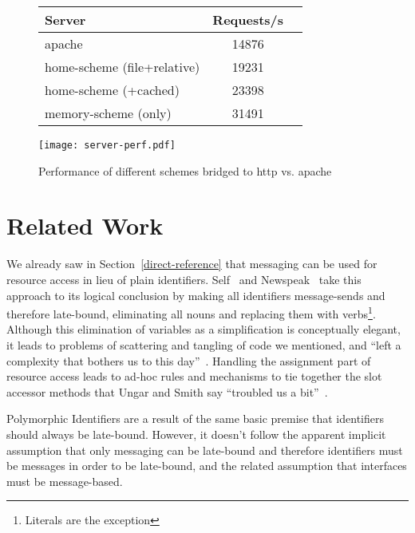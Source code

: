 \documentclass[preprint]{sigplanconf}
\begin{document}
\begin{figure}
\begin{minipage}[c]{0.58\textwidth}
\begin{tabular}{|l|c|c|} \hline
Server   &  Requests/s    \\ \hline
apache & 	14876	      \\ %
home-scheme (file+relative) &  19231   \\ %
home-scheme (+cached)  &  23398  \\ %
memory-scheme (only) &  31491  \\ \hline
\end{tabular}
\end{minipage}
\begin{minipage}[c]{0.58\textwidth}
\texttt{[image: server-perf.pdf]}
\end{minipage}
\vspace{-2.0em}
\caption{Performance of different schemes bridged to http vs. apache}
\label{http-server-speed}
\end{figure}





\section{Related Work}
\label{related-work}


We already saw in Section~\ref{direct-reference} that messaging can be used for resource
access in lieu of plain identifiers.  Self~\cite{UngarS87} and Newspeak~\cite{Bracha:2010:MON:1883978.1884007} take this
approach to its logical conclusion by making all identifiers message-sends and therefore late-bound, eliminating
all nouns and replacing them with verbs\footnote{Literals are the exception}.  Although
this elimination of variables as a simplification is conceptually elegant, it leads to problems of scattering and tangling of code we
mentioned, and  ``left a complexity that bothers us to this day''~\cite{Ungar:2007:SEL:1238844.1238853}.
Handling the assignment part of resource access leads to ad-hoc rules and mechanisms to tie together
the slot accessor methods that Ungar and Smith say ``troubled us a bit''~\cite{Ungar:2007:SEL:1238844.1238853}.

Polymorphic Identifiers are a result of the same basic premise that identifiers should always be late-bound.  However,
it doesn't follow the apparent implicit assumption that only messaging can be late-bound and therefore identifiers must
be messages in order to be late-bound, and the related assumption that interfaces must be message-based.
\end{document}
